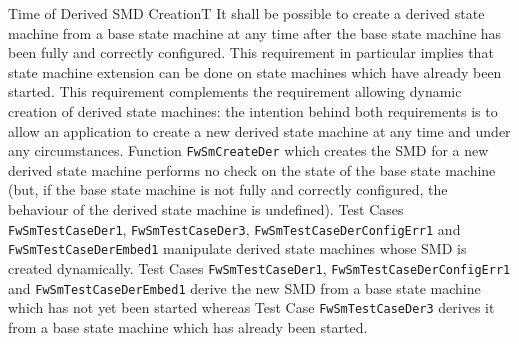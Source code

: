 \documentclass[a4paper,10pt]{article}
\newenvironment{fw_req_note}[7]
{\addtocounter{subsubsection}{1}
	\hspace{0.2cm}\textbf{FW-\arabic{section}.\arabic{subsection}.\arabic{subsubsection}/#2
	\hspace{0.8cm} #1}
	\vspace{-10pt}
\begin{longtable}{p{2.7cm}P{8.5cm}}
\hline
\textsc{Requirement} & #3 \\
\textsc{Note} & #4 \\
\textsc{Justification} & #5 \\
\textsc{Implementation} & #6  \\ 
\textsc{Verification} & #7  \\
\hline
}
{\end{longtable}}
\begin{document}
\begin{fw_req_note}{Time of Derived SMD Creation}{T}
{It shall be possible to create a derived state machine from a 
base state machine at any time after the base state machine has been fully and correctly 
configured.}
{This requirement in particular implies that state machine extension can 
be done on state machines which have already been started.}
{This requirement complements the requirement allowing dynamic 
creation of derived state machines: the intention behind both requirements is to allow an 
application to create a new derived state machine at any time and under any circumstances.}
{Function \texttt{FwSmCreateDer} which creates the SMD for a new 
derived state machine performs no check on the state of the  base state machine (but, if 
the base state machine is not fully and correctly configured, the behaviour of the derived 
state machine is undefined).} 
{Test Cases \texttt{FwSmTestCaseDer1}, \texttt{FwSmTestCaseDer3}, 
\texttt{FwSmTestCaseDerConfigErr1} and \texttt{FwSmTestCaseDerEmbed1} 
manipulate derived state machines whose SMD is created dynamically. 
Test Cases \texttt{FwSmTestCaseDer1}, \texttt{FwSmTestCaseDerConfigErr1} and 
\texttt{FwSmTestCaseDerEmbed1} derive the new SMD from a base state machine which has not 
yet been started whereas Test Case \texttt{FwSmTestCaseDer3} 
derives it from a base state machine which has already been started.}
\end{fw_req_note}
\end{document}
